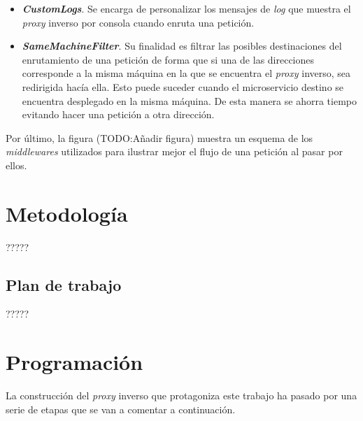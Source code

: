 \documentclass[11pt,spanish,listoffigures]{tfgetsinf}
\begin{document}
\begin{itemize}

	\item \textbf{\emph{CustomLogs}}. Se encarga de personalizar los mensajes de \emph{log} que muestra el \emph{proxy} inverso por consola cuando enruta una petición.

	\item \textbf{\emph{SameMachineFilter}}. Su finalidad es filtrar las posibles destinaciones del enrutamiento de una petición de forma que si una de las direcciones corresponde a la misma máquina en la que se encuentra el \emph{proxy} inverso, sea redirigida hacía ella. Esto puede suceder cuando el microservicio destino se encuentra desplegado en la misma máquina. De esta manera se ahorra tiempo evitando hacer una petición a otra dirección.

\end{itemize}

Por último, la figura (TODO:Añadir figura) muestra un esquema de los \emph{middlewares} utilizados para ilustrar mejor el flujo de una petición al pasar por ellos.



	\section{Metodología}

?????


		\subsection{Plan de trabajo}

?????


	\section{Programación}

La construcción del \emph{proxy} inverso que protagoniza este trabajo ha pasado por una serie de etapas que se van a comentar a continuación.

\end{document}
